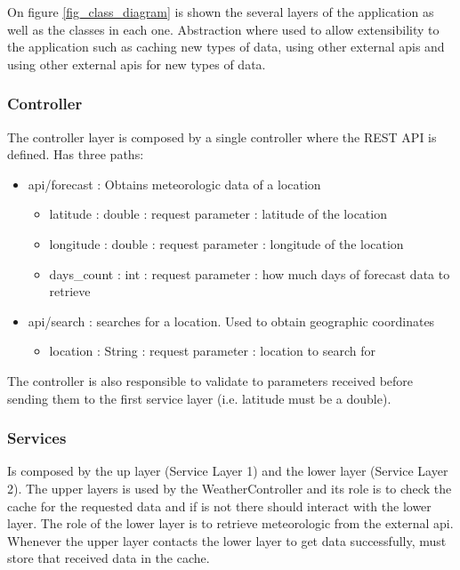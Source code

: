 \documentclass[12pt]{article}
\begin{document}
On figure \ref{fig_class_diagram} is shown the several layers of the application as well as the
  classes in each one. Abstraction where used to allow extensibility to the application such as
  caching new types of data, using other external apis and using other external apis for new
  types of data.

\subsubsection{Controller}

The controller layer is composed by a single controller where the REST API is
  defined. Has three paths:
  \begin{itemize}
    \item api/forecast : Obtains meteorologic data of a location
      \begin{itemize}
        \item latitude : double : request parameter : latitude of the location
        \item longitude : double : request parameter : longitude of the location
        \item days\_count : int : request parameter : how much days of forecast data to retrieve
      \end{itemize}
    \item api/search : searches for a location. Used to obtain geographic coordinates
      \begin{itemize}
        \item location : String : request parameter : location to search for
      \end{itemize}
  \end{itemize}

The controller is also responsible to validate to parameters received before sending them to the
  first service layer (i.e. latitude must be a double).

\subsubsection{Services}

Is composed by the up layer (Service Layer 1) and the lower layer (Service Layer 2). The upper layers
  is used by the WeatherController and its role is to check the cache for the requested data and if
  is not there should interact with the lower layer. The role of the lower layer is to retrieve
  meteorologic from the external api. Whenever the upper layer contacts the lower layer to
  get data successfully, must store that received data in the cache.
\end{document}

